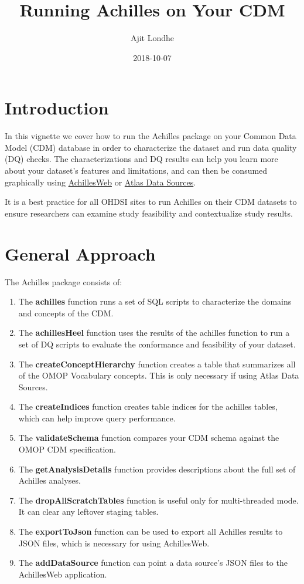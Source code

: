\documentclass[]{article}
\title{Running Achilles on Your CDM}
\author{Ajit Londhe}
\date{2018-10-07}
\providecommand{\tightlist}{%
  \setlength{\itemsep}{0pt}\setlength{\parskip}{0pt}}
\begin{document}
\maketitle

{
\setcounter{tocdepth}{2}
\tableofcontents
}
\section{Introduction}\label{introduction}

In this vignette we cover how to run the Achilles package on your Common
Data Model (CDM) database in order to characterize the dataset and run
data quality (DQ) checks. The characterizations and DQ results can help
you learn more about your dataset's features and limitations, and can
then be consumed graphically using
\href{https://github.com/OHDSI/AchillesWeb}{AchillesWeb} or
\href{https://github.com/OHDSI/Atlas}{Atlas Data Sources}.

It is a best practice for all OHDSI sites to run Achilles on their CDM
datasets to ensure researchers can examine study feasibility and
contextualize study results.

\section{General Approach}\label{general-approach}

The Achilles package consists of:

\begin{enumerate}
\def\labelenumi{\arabic{enumi}.}
\tightlist
\item
  The \textbf{achilles} function runs a set of SQL scripts to
  characterize the domains and concepts of the CDM.
\item
  The \textbf{achillesHeel} function uses the results of the achilles
  function to run a set of DQ scripts to evaluate the conformance and
  feasibility of your dataset.
\item
  The \textbf{createConceptHierarchy} function creates a table that
  summarizes all of the OMOP Vocabulary concepts. This is only necessary
  if using Atlas Data Sources.
\item
  The \textbf{createIndices} function creates table indices for the
  achilles tables, which can help improve query performance.
\item
  The \textbf{validateSchema} function compares your CDM schema against
  the OMOP CDM specification.
\item
  The \textbf{getAnalysisDetails} function provides descriptions about
  the full set of Achilles analyses.
\item
  The \textbf{dropAllScratchTables} function is useful only for
  multi-threaded mode. It can clear any leftover staging tables.
\item
  The \textbf{exportToJson} function can be used to export all Achilles
  results to JSON files, which is necessary for using AchillesWeb.
\item
  The \textbf{addDataSource} function can point a data source's JSON
  files to the AchillesWeb application.
\end{enumerate}
\end{document}
